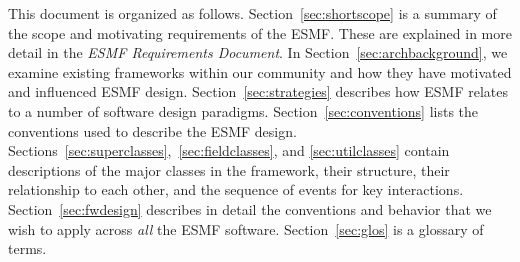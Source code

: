 This document is organized as follows.  Section~\ref{sec:shortscope} is a summary of the 
scope and motivating requirements of the ESMF.  These are explained in more detail in 
the {\it ESMF Requirements Document}.  In Section~\ref{sec:archbackground}, 
we examine existing frameworks within our community and how they have motivated
and influenced ESMF design.  Section~\ref{sec:strategies} describes how ESMF relates 
to a number of software design paradigms.  Section~\ref{sec:conventions} lists the
conventions used to describe the ESMF design.
Sections~\ref{sec:superclasses},~\ref{sec:fieldclasses}, and
\ref{sec:utilclasses} contain descriptions of the 
major classes in the framework, their structure, their relationship to each other, 
and the sequence of events for key interactions.  Section~\ref{sec:fwdesign} 
describes in detail the conventions and behavior
that we wish to apply across {\it all} the ESMF software.  Section~\ref{sec:glos} is a 
glossary of terms.







